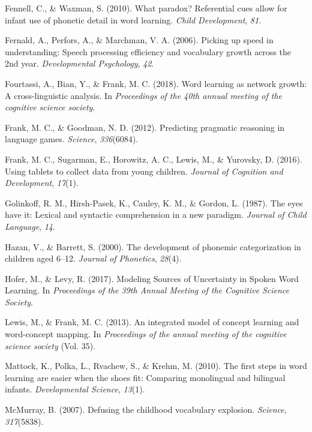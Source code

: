 \documentclass[english,,man]{apa6}
\theoremstyle{definition}
\theoremstyle{definition}
\theoremstyle{definition}
\theoremstyle{remark}
\begin{document}
\hypertarget{ref-fennell2010}{}
Fennell, C., \& Waxman, S. (2010). What paradox? Referential cues allow
for infant use of phonetic detail in word learning. \emph{Child
Development}, \emph{81}.

\hypertarget{ref-fernald2006}{}
Fernald, A., Perfors, A., \& Marchman, V. A. (2006). Picking up speed in
understanding: Speech processing efficiency and vocabulary growth across
the 2nd year. \emph{Developmental Psychology}, \emph{42}.

\hypertarget{ref-fourtassi2018}{}
Fourtassi, A., Bian, Y., \& Frank, M. C. (2018). Word learning as
network growth: A cross-linguistic analysis. In \emph{Proceedings of the
40th annual meeting of the cognitive science society}.

\hypertarget{ref-frank2012}{}
Frank, M. C., \& Goodman, N. D. (2012). Predicting pragmatic reasoning
in language games. \emph{Science}, \emph{336}(6084).

\hypertarget{ref-frank2016}{}
Frank, M. C., Sugarman, E., Horowitz, A. C., Lewis, M., \& Yurovsky, D.
(2016). Using tablets to collect data from young children. \emph{Journal
of Cognition and Development}, \emph{17}(1).

\hypertarget{ref-golinkoff1987}{}
Golinkoff, R. M., Hirsh-Pasek, K., Cauley, K. M., \& Gordon, L. (1987).
The eyes have it: Lexical and syntactic comprehension in a new paradigm.
\emph{Journal of Child Language}, \emph{14}.

\hypertarget{ref-hazan2000}{}
Hazan, V., \& Barrett, S. (2000). The development of phonemic
categorization in children aged 6--12. \emph{Journal of Phonetics},
\emph{28}(4).

\hypertarget{ref-hofer2017}{}
Hofer, M., \& Levy, R. (2017). Modeling Sources of Uncertainty in Spoken
Word Learning. In \emph{Proceedings of the 39th Annual Meeting of the
Cognitive Science Society}.

\hypertarget{ref-lewis2013}{}
Lewis, M., \& Frank, M. C. (2013). An integrated model of concept
learning and word-concept mapping. In \emph{Proceedings of the annual
meeting of the cognitive science society} (Vol. 35).

\hypertarget{ref-Mattock2010}{}
Mattock, K., Polka, L., Rvachew, S., \& Krehm, M. (2010). The first
steps in word learning are easier when the shoes fit: Comparing
monolingual and bilingual infants. \emph{Developmental Science},
\emph{13}(1).

\hypertarget{ref-McMurray2007}{}
McMurray, B. (2007). Defusing the childhood vocabulary explosion.
\emph{Science}, \emph{317}(5838).
\end{document}
